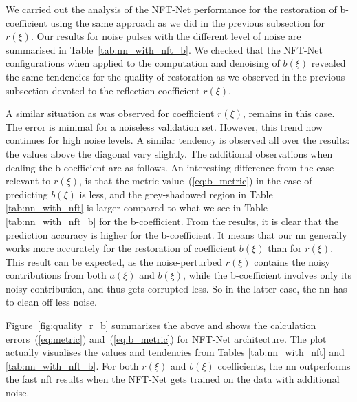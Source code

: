We carried out the analysis of the NFT-Net performance for the restoration of b-coefficient using the same approach as we did in the previous subsection for $r(\xi)$. Our results for noise pulses with the different level of noise are summarised in Table~\ref{tab:nn_with_nft_b}. 
We checked that the NFT-Net configurations when applied to the computation and denoising of $b(\xi)$ revealed the same tendencies for the quality of restoration as we observed in the previous subsection devoted to the reflection coefficient $r(\xi)$.

A similar situation as was observed for coefficient $r(\xi)$, remains in this case. The error is minimal for a noiseless validation set. However, this trend now continues for high noise levels.
A similar tendency is observed all over the results: the values above the diagonal vary slightly.
The additional observations when dealing the b-coefficient are as follows. An interesting difference from the case relevant to $r(\xi)$, is that the metric value~(\ref{eq:b_metric}) in the case of predicting $b(\xi)$ is less, and the grey-shadowed region in Table \ref{tab:nn_with_nft} is larger compared to what we see in Table \ref{tab:nn_with_nft_b} for the b-coefficient.
From the results, it is clear that the prediction accuracy is higher for the b-coefficient. 
It means that our \acrshort{nn} generally works more accurately for the restoration of coefficient $b(\xi)$ than for $r(\xi)$. This result can be expected, as the noise-perturbed $r(\xi)$ contains the noisy contributions from both $a(\xi)$ and $b(\xi)$, while the b-coefficient involves only its noisy contribution, and thus gets corrupted less. So in the latter case, the \acrshort{nn} has to clean off less noise.

Figure~\ref{fig:quality_r_b} summarizes the above and shows the calculation errors~(\ref{eq:metric}) and~(\ref{eq:b_metric})  for NFT-Net architecture. The plot actually visualises the values and tendencies from Tables \ref{tab:nn_with_nft} and \ref{tab:nn_with_nft_b}. For both $r(\xi)$ and $b(\xi)$ coefficients, the \acrshort{nn} outperforms the fast \acrshort{nft} results when the NFT-Net gets trained on the data with additional noise. 


